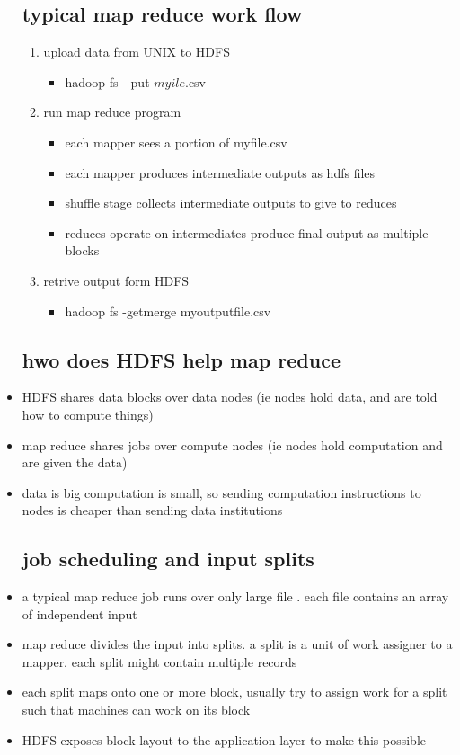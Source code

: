 \documentclass{article}
\begin{document}
\begin{itemize}
\subsection{typical map reduce work flow }
\begin{enumerate}
    \item upload data from UNIX to HDFS
    \begin{itemize}
    \item hadoop fs - put $myile$.csv
\end{itemize}
\item run map reduce program 
\begin{itemize}
    \item each mapper sees a portion of myfile.csv
    \item each mapper produces intermediate outputs as hdfs files 
    \item shuffle stage collects intermediate outputs to give to reduces 
    \item reduces operate on intermediates produce final output as multiple blocks 
\end{itemize}
\item retrive output form HDFS
\begin{itemize}
    \item hadoop fs -getmerge myoutputfile.csv
\end{itemize}
\end{enumerate}
\subsection{hwo does HDFS help map reduce }
\item HDFS shares data blocks over data nodes (ie nodes hold data, and are told how to compute things) 
\item map reduce shares jobs over compute nodes (ie nodes hold computation and are given the data)
\item data is big computation is small, so sending computation instructions to nodes is cheaper than sending data institutions 
\subsection{job scheduling and input splits}
\item a typical map reduce job runs over only large file . each file contains an array of independent input
\item map reduce divides the input into splits. a split is a unit of work assigner to a mapper. each split might contain  multiple records
\item each split maps onto one or more block, usually try to assign work for a split such that machines can work on its block 
\item HDFS exposes block layout to the application layer to make this possible

\end{itemize}
\end{document}
